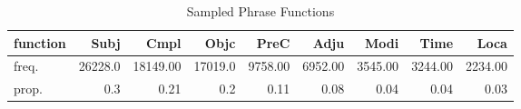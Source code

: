\begin{table}[htbp!]
\centering
\caption{Sampled Phrase Functions}
\label{table:funct_counts}
\begin{adjustbox}{width=1\textwidth}
\begin{tabular}{lrrrrrrrr}
\toprule
function &     Subj &      Cmpl &     Objc &     PreC &     Adju &     Modi &     Time &     Loca \\
\midrule
freq. &  26228.0 &  18149.00 &  17019.0 &  9758.00 &  6952.00 &  3545.00 &  3244.00 &  2234.00 \\
prop. &      0.3 &      0.21 &      0.2 &     0.11 &     0.08 &     0.04 &     0.04 &     0.03 \\
\bottomrule
\end{tabular}
\end{adjustbox}
\end{table}
